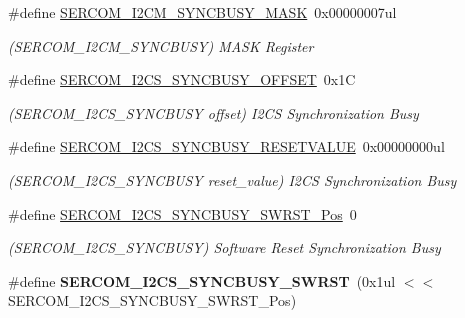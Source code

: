 \begin{DoxyCompactItemize}
\item 
\hypertarget{group___s_a_m_l21___s_e_r_c_o_m_ga968affbd2d6434b32c1f455315f5fb2f}{}\#define \hyperlink{group___s_a_m_l21___s_e_r_c_o_m_ga968affbd2d6434b32c1f455315f5fb2f}{S\+E\+R\+C\+O\+M\+\_\+\+I2\+C\+M\+\_\+\+S\+Y\+N\+C\+B\+U\+S\+Y\+\_\+\+M\+A\+S\+K}~0x00000007ul\label{group___s_a_m_l21___s_e_r_c_o_m_ga968affbd2d6434b32c1f455315f5fb2f}

\begin{DoxyCompactList}\small\item\em (S\+E\+R\+C\+O\+M\+\_\+\+I2\+C\+M\+\_\+\+S\+Y\+N\+C\+B\+U\+S\+Y) M\+A\+S\+K Register \end{DoxyCompactList}\item 
\hypertarget{group___s_a_m_l21___s_e_r_c_o_m_ga9b75c4311fbe3223c0e6e3ccdcd04d30}{}\#define \hyperlink{group___s_a_m_l21___s_e_r_c_o_m_ga9b75c4311fbe3223c0e6e3ccdcd04d30}{S\+E\+R\+C\+O\+M\+\_\+\+I2\+C\+S\+\_\+\+S\+Y\+N\+C\+B\+U\+S\+Y\+\_\+\+O\+F\+F\+S\+E\+T}~0x1\+C\label{group___s_a_m_l21___s_e_r_c_o_m_ga9b75c4311fbe3223c0e6e3ccdcd04d30}

\begin{DoxyCompactList}\small\item\em (S\+E\+R\+C\+O\+M\+\_\+\+I2\+C\+S\+\_\+\+S\+Y\+N\+C\+B\+U\+S\+Y offset) I2\+C\+S Synchronization Busy \end{DoxyCompactList}\item 
\hypertarget{group___s_a_m_l21___s_e_r_c_o_m_gac7dd754b3b805c6e9454f63b84541fe9}{}\#define \hyperlink{group___s_a_m_l21___s_e_r_c_o_m_gac7dd754b3b805c6e9454f63b84541fe9}{S\+E\+R\+C\+O\+M\+\_\+\+I2\+C\+S\+\_\+\+S\+Y\+N\+C\+B\+U\+S\+Y\+\_\+\+R\+E\+S\+E\+T\+V\+A\+L\+U\+E}~0x00000000ul\label{group___s_a_m_l21___s_e_r_c_o_m_gac7dd754b3b805c6e9454f63b84541fe9}

\begin{DoxyCompactList}\small\item\em (S\+E\+R\+C\+O\+M\+\_\+\+I2\+C\+S\+\_\+\+S\+Y\+N\+C\+B\+U\+S\+Y reset\+\_\+value) I2\+C\+S Synchronization Busy \end{DoxyCompactList}\item 
\hypertarget{group___s_a_m_l21___s_e_r_c_o_m_gacd7247af68816f0c5938ef1a683416b8}{}\#define \hyperlink{group___s_a_m_l21___s_e_r_c_o_m_gacd7247af68816f0c5938ef1a683416b8}{S\+E\+R\+C\+O\+M\+\_\+\+I2\+C\+S\+\_\+\+S\+Y\+N\+C\+B\+U\+S\+Y\+\_\+\+S\+W\+R\+S\+T\+\_\+\+Pos}~0\label{group___s_a_m_l21___s_e_r_c_o_m_gacd7247af68816f0c5938ef1a683416b8}

\begin{DoxyCompactList}\small\item\em (S\+E\+R\+C\+O\+M\+\_\+\+I2\+C\+S\+\_\+\+S\+Y\+N\+C\+B\+U\+S\+Y) Software Reset Synchronization Busy \end{DoxyCompactList}\item 
\hypertarget{group___s_a_m_l21___s_e_r_c_o_m_gada6b572a06d5d583174c1cd642c100be}{}\#define {\bfseries S\+E\+R\+C\+O\+M\+\_\+\+I2\+C\+S\+\_\+\+S\+Y\+N\+C\+B\+U\+S\+Y\+\_\+\+S\+W\+R\+S\+T}~(0x1ul $<$$<$ S\+E\+R\+C\+O\+M\+\_\+\+I2\+C\+S\+\_\+\+S\+Y\+N\+C\+B\+U\+S\+Y\+\_\+\+S\+W\+R\+S\+T\+\_\+\+Pos)\label{group___s_a_m_l21___s_e_r_c_o_m_gada6b572a06d5d583174c1cd642c100be}


\end{DoxyCompactItemize}
